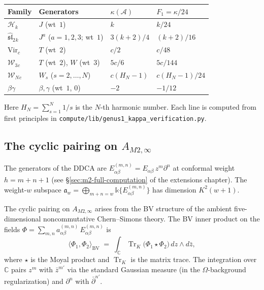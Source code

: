 \documentclass[11pt]{article}
\newcommand{\cA}{\mathcal{A}}
\newcommand{\cW}{\mathcal{W}}
\newcommand{\cH}{\mathcal{H}}
\newcommand{\fsl}{\mathfrak{sl}}
\newcommand{\C}{\mathbb{C}}
\newcommand{\Tr}{\operatorname{Tr}}
\begin{document}
\begin{center}
\renewcommand{\arraystretch}{1.3}
\begin{tabular}{llll}
\textbf{Family} & \textbf{Generators} & $\kappa(\cA)$ & \textbf{$F_1 = \kappa/24$} \\
\hline
$\cH_k$ & $J$ (wt~$1$) & $k$ & $k/24$ \\
$\widehat{\fsl}_2{}_k$ & $J^a$ ($a=1,2,3$; wt~$1$) & $3(k+2)/4$ & $(k+2)/16$ \\
$\mathrm{Vir}_c$ & $T$ (wt~$2$) & $c/2$ & $c/48$ \\
$\cW_3{}_c$ & $T$ (wt~$2$), $W$ (wt~$3$) & $5c/6$ & $5c/144$ \\
$\cW_N{}_c$ & $W_s$ ($s=2,\ldots,N$) & $c(H_N - 1)$ & $c(H_N-1)/24$ \\
$\beta\gamma$ & $\beta,\gamma$ (wt~$1$, $0$) & $-2$ & $-1/12$
\end{tabular}
\end{center}
Here $H_N = \sum_{s=1}^N 1/s$ is the $N$-th harmonic number.
Each line is computed from first principles in
\texttt{compute/lib/genus1\_kappa\_verification.py}.

\subsection{The cyclic pairing on $A_{M2,\infty}$}

The generators of the DDCA are
$E^{(m,n)}_{\alpha\beta} = E_{\alpha\beta}\, z^m \partial^n$
at conformal weight $h = m + n + 1$ (see
\S\ref{sec:m2-full-computation} of the extensions chapter).  The
weight-$w$ subspace
$\mathfrak{a}_w = \bigoplus_{m+n=w}
\mathbb{k}\{E^{(m,n)}_{\alpha\beta}\}$
has dimension $K^2(w+1)$.

The cyclic pairing on $A_{M2,\infty}$ arises from the BV
structure of the ambient five-dimensional noncommutative
Chern--Simons theory.  The BV inner product on the fields
$\Phi = \sum_{m,n} a^{(m,n)}_{\alpha\beta}\,
E^{(m,n)}_{\alpha\beta}$ is
\begin{equation}\label{eq:m2-bv-pairing}
\langle \Phi_1, \Phi_2 \rangle_{\mathrm{BV}}
\;=\;
\int_{\C} \Tr_K\!\bigl(\Phi_1 \star \Phi_2\bigr)\, dz \wedge d\bar{z},
\end{equation}
where $\star$ is the Moyal product and $\Tr_K$ is the matrix
trace.  The integration over $\C$ pairs $z^m$ with $\bar{z}^{m'}$
via the standard Gaussian measure (in the $\Omega$-background
regularization) and $\partial^n$ with $\bar{\partial}^{n'}$.
\end{document}
